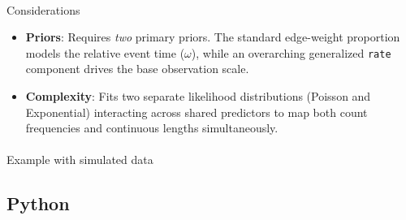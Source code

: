 \documentclass[
  letterpaper,
  DIV=11,
  numbers=noendperiod]{scrartcl}
\makeatletter
\let\oldparagraph\paragraph
\renewcommand{\paragraph}{
    \@ifstar
      \xxxParagraphStar
      \xxxParagraphNoStar
  }
\newcommand{\xxxParagraphStar}[1]{\oldparagraph*{#1}\mbox{}}
\newcommand{\xxxParagraphNoStar}[1]{\oldparagraph{#1}\mbox{}}
\providecommand{\tightlist}{%
  \setlength{\itemsep}{0pt}\setlength{\parskip}{0pt}}
\makeatother
\begin{document}
\paragraph{Considerations}\label{considerations-2}

\begin{tcolorbox}[enhanced jigsaw, colframe=quarto-callout-note-color-frame, bottomtitle=1mm, coltitle=black, titlerule=0mm, colbacktitle=quarto-callout-note-color!10!white, colback=white, opacitybacktitle=0.6, rightrule=.15mm, toptitle=1mm, opacityback=0, arc=.35mm, left=2mm, title=\textcolor{quarto-callout-note-color}{\faInfo}\hspace{0.5em}{Note}, breakable, bottomrule=.15mm, toprule=.15mm, leftrule=.75mm]

\begin{itemize}
\tightlist
\item
  \textbf{Priors}: Requires \emph{two} primary priors. The standard
  edge-weight proportion models the relative event time (\(\omega\)),
  while an overarching generalized \texttt{rate} component drives the
  base observation scale.
\item
  \textbf{Complexity}: Fits two separate likelihood distributions
  (Poisson and Exponential) interacting across shared predictors to map
  both count frequencies and continuous lengths simultaneously.
\end{itemize}

\end{tcolorbox}

\paragraph{Example with simulated
data}\label{example-with-simulated-data-1}

\subsection{Python}
\end{document}
